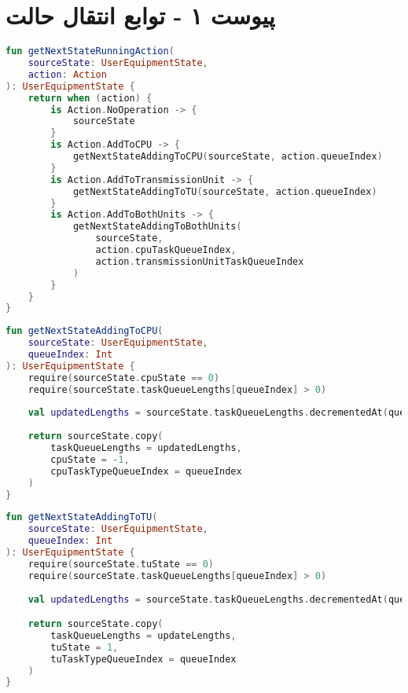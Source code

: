\chapter*{پیوست ۱ - توابع انتقال حالت}

\begin{latin}
	\begin{lstlisting}[language=Kotlin, title=\rl{تابع انتقال حالت به ازای کنش ورودی}]
fun getNextStateRunningAction(
    sourceState: UserEquipmentState,
    action: Action
): UserEquipmentState {	
	return when (action) {
		is Action.NoOperation -> {
			sourceState
		}
		is Action.AddToCPU -> {
			getNextStateAddingToCPU(sourceState, action.queueIndex)
		}
		is Action.AddToTransmissionUnit -> {
			getNextStateAddingToTU(sourceState, action.queueIndex)
		}
		is Action.AddToBothUnits -> {
			getNextStateAddingToBothUnits(
			    sourceState,
			    action.cpuTaskQueueIndex,
			    action.transmissionUnitTaskQueueIndex
			)
		}
	}
}
\end{lstlisting}
\end{latin}
\begin{latin}
	\begin{lstlisting}[language=Kotlin, title=\rl{تابع انتقال حالت پایه}]
fun getNextStateAddingToCPU(
    sourceState: UserEquipmentState, 
    queueIndex: Int
): UserEquipmentState {
	require(sourceState.cpuState == 0)
	require(sourceState.taskQueueLengths[queueIndex] > 0)
	
	val updatedLengths = sourceState.taskQueueLengths.decrementedAt(queueIndex)
	
	return sourceState.copy(
	    taskQueueLengths = updatedLengths,
	    cpuState = -1,
	    cpuTaskTypeQueueIndex = queueIndex
	)
}
	\end{lstlisting}
\end{latin}

\begin{latin}
	\begin{lstlisting}[language=Kotlin, title=\rl{تابع انتقال حالت با کنش ارسال توسط واحد ارسال}]
fun getNextStateAddingToTU(
    sourceState: UserEquipmentState,
    queueIndex: Int
): UserEquipmentState {
	require(sourceState.tuState == 0)
	require(sourceState.taskQueueLengths[queueIndex] > 0)
	
	val updatedLengths = sourceState.taskQueueLengths.decrementedAt(queueIndex)

	return sourceState.copy(
	    taskQueueLengths = updateLengths,
	    tuState = 1,
	    tuTaskTypeQueueIndex = queueIndex
	)
}
	\end{lstlisting}
\end{latin}

